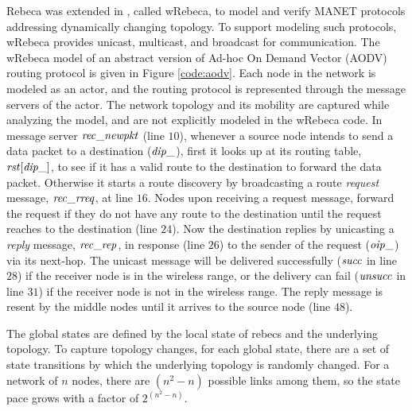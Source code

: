 Rebeca was extended in \cite{FOAC}, called wRebeca, to model and verify %
MANET protocols addressing dynamically changing topology. To support modeling such protocols, wRebeca provides unicast, multicast, and broadcast for communication. The wRebeca model of an abstract version of Ad-hoc On Demand Vector (AODV) routing protocol \cite{AODV} is given in Figure \ref{code:aodv}. Each node in the network is modeled as an actor, and the routing protocol
is represented through the message servers of the actor. The network topology and its mobility are captured while analyzing the model, and are not explicitly modeled in the wRebeca code.  
%
In message server ${\it rec\_newpkt}$ (line $10$),
whenever a source node intends to send a data packet to a destination (${\it dip\_}$), %
first it looks up at its routing table, ${\it rst}[{\it dip\_}]$, to see if it has a valid route to the destination to forward the data packet. Otherwise it starts a route discovery by broadcasting a route \emph{request} message, ${\it rec\_rreq}$, at line $16$. 
%
Nodes upon receiving a request message, forward the request if they do not have any route to the destination until the request reaches to the destination (line $24$). Now the destination replies by unicasting a \emph{reply} message, ${\it rec\_rep}$, in response (line $26$) to the sender of the request (${\it oip\_}$) via its next-hop. The unicast message will be delivered
successfully ($\it succ$ in line $28$) if the receiver node is in the wireless range, or the
delivery can fail ($\it unsucc$ in line $31$) if the receiver node is not in the wireless range. The reply message is resent by the middle nodes until it arrives to the source node (line $48$).

\begin{figure*}
	\begin{center}
		
	\end{center}
	\caption{The AODV protocol specified by wRebeca \label{code:aodv}\cite{FOAC}}
\end{figure*} 

The global states %
are defined by the local state of rebecs and the underlying topology. %
To capture topology changes, for each global state, there are a set of state transitions by which the underlying topology is randomly changed.  For a network of $n$ nodes, there are $(n^2-n)$ possible links among them, %
so the state pace grows with a factor of $2^{(n^2-n)}$. 

